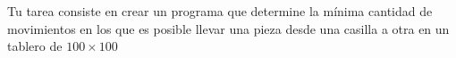 \documentclass{oci}
\begin{document}
\begin{problemDescription}
  \begin{center}
  \small
  \end{center}
  
  Tu tarea consiste en crear un programa que determine la mínima cantidad de movimientos en los que es posible llevar una pieza desde una casilla a otra en un tablero de $100\times 100$
\end{problemDescription}
\end{document}
